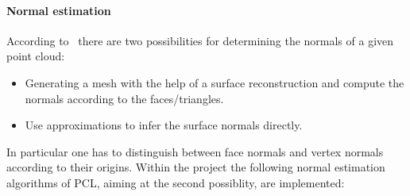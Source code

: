 \documentclass[paper=a4,11pt,bibliography=totoc]{scrartcl}
\begin{document}
\paragraph*{Normal estimation}
According to~\cite{pcldoc} there are two possibilities for determining the normals of a given point cloud:
\begin{itemize}
\item Generating a mesh with the help of a surface reconstruction and compute the normals according to the faces/triangles.
\item Use approximations to infer the surface normals directly.
\end{itemize}
%
In particular one has to distinguish between face normals and vertex normals according to their origins. Within the project the following normal estimation algorithms of PCL, aiming at the second possiblity, are implemented:
%
\end{document}
